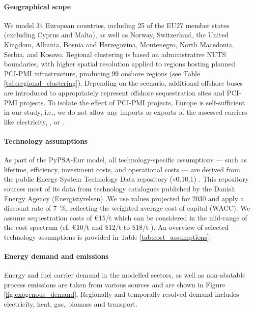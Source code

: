 \documentclass[preprint,12pt,sort&compress]{elsarticle}
\begin{document}
\paragraph{Geographical scope} 
\label{sec:geographical_scope}
We model 34 European countries, including 25 of the EU27 member states (excluding Cyprus and Malta), as well as Norway, Switzerland, the United Kingdom, Albania, Bosnia and Herzegovina, Montenegro, North Macedonia, Serbia, and Kosovo. Regional clustering is based on administrative NUTS boundaries, with higher spatial resolution applied to regions hosting planned PCI-PMI infrastructure, producing 99 onshore regions (see Table \ref{tab:regional_clustering}). Depending on the scenario, additional offshore buses are introduced to appropriately represent offshore sequestration sites and PCI-PMI projects. To isolate the effect of PCI-PMI projects, Europe is self-sufficient in our study, i.e., we do not allow any imports or exports of the assessed carriers like electricity, , or . 

\paragraph{Technology assumptions} 
\label{sec:technology_assumptions}
As part of the PyPSA-Eur model, all technology-specific assumptions --- such as lifetime, efficiency, investment costs, and operational costs --- are derived from the public Energy System Technology Data repository (v0.10.1) \cite{zeyenPyPSATechnologydataV01012025}. This repository sources most of its data from technology catalogues published by the Danish Energy Agency (Energistyrelsen) \cite{energistyrelsendanishenergyagencyTechnologyCatalogues2024}.We use values projected for 2030 and apply a discount rate of \SI{7}{\percent}, reflecting the weighted average cost of capital (WACC). We assume  sequestration costs of \euro{15}/t which can be considered in the mid-range of the cost spectrum (cf. \euro{10}/t \cite{hofmannH2CO2Network2025} and \$12/t to \$18/t \cite{rubinCostCO2Capture2015}). An overview of selected technology assumptions is provided in Table \ref{tab:cost_assumptions}.

\paragraph{Energy demand and  emissions}
\label{sec:energy_demand_and_co2_emissions}
Energy and fuel carrier demand in the modelled sectors, as well as non-abatable  process emissions are taken from various sources \cite{mantzosJRCIDEES20152018,eurostatCompleteEnergyBalances2022,manzGeoreferencedIndustrialSites2018,muehlenpfordtTimeSeries2019,krienOemofDemandlibV0222025} and are shown in Figure \ref{fig:exogenous_demand}. Regionally and temporally resolved demand includes electricity, heat, gas, biomass and transport. 
\end{document}
